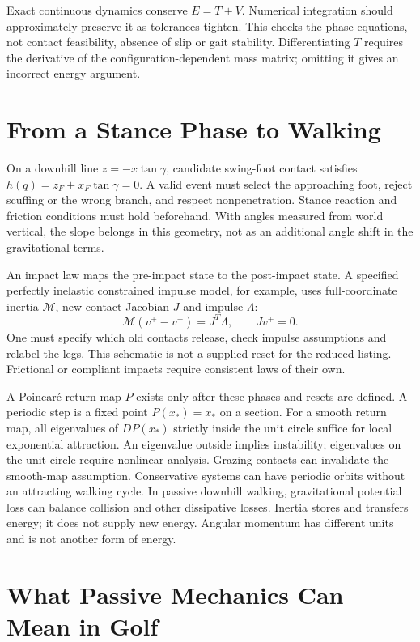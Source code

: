 Exact continuous dynamics conserve $E=T+V$. Numerical integration should
approximately preserve it as tolerances tighten. This checks the phase
equations, not contact feasibility, absence of slip or gait stability.
Differentiating $T$ requires the derivative of the configuration-dependent
mass matrix; omitting it gives an incorrect energy argument.

\section{From a Stance Phase to Walking}

On a downhill line $z=-x\tan\gamma$, candidate swing-foot contact satisfies
$h(q)=z_F+x_F\tan\gamma=0$. A valid event must select the approaching foot,
reject scuffing or the wrong branch, and respect nonpenetration. Stance
reaction and friction conditions must hold beforehand. With angles measured
from world vertical, the slope belongs in this geometry, not as an additional
angle shift in the gravitational terms.

An impact law maps the pre-impact state to the post-impact state. A specified
perfectly inelastic constrained impulse model, for example, uses full-coordinate
inertia $\mathcal M$, new-contact Jacobian $J$ and impulse $\Lambda$:
\begin{equation}
 \mathcal M(v^+-v^-)=J^T\Lambda,\qquad Jv^+=0.
\end{equation}
One must specify which old contacts release, check impulse assumptions and
relabel the legs. This schematic is not a supplied reset for the reduced
listing. Frictional or compliant impacts require consistent laws of their own.

A Poincar\'e return map $P$ exists only after these phases and resets are
defined. A periodic step is a fixed point $P(x_*)=x_*$ on a section. For a
smooth return map, all eigenvalues of $DP(x_*)$ strictly inside the unit
circle suffice for local exponential attraction. An eigenvalue outside
implies instability; eigenvalues on the unit circle require nonlinear
analysis. Grazing contacts can invalidate the smooth-map assumption.
Conservative systems can have periodic orbits without an attracting
walking cycle. In passive downhill walking, gravitational potential loss can
balance collision and other dissipative losses. Inertia stores and transfers
energy; it does not supply new energy. Angular momentum has different units
and is not another form of energy.

\section{What Passive Mechanics Can Mean in Golf}

